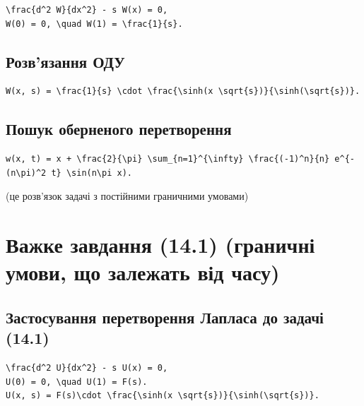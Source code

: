 \documentclass[
  ukrainian,
]{article}
\begin{document}
\begin{verbatim}
\frac{d^2 W}{dx^2} - s W(x) = 0,
W(0) = 0, \quad W(1) = \frac{1}{s}.
\end{verbatim}

\subsection{Розв'язання
ОДУ}\label{ux440ux43eux437ux432ux44fux437ux430ux43dux43dux44f-ux43eux434ux443}

\begin{verbatim}
W(x, s) = \frac{1}{s} \cdot \frac{\sinh(x \sqrt{s})}{\sinh(\sqrt{s})}.
\end{verbatim}

\subsection{Пошук оберненого
перетворення}\label{ux43fux43eux448ux443ux43a-ux43eux431ux435ux440ux43dux435ux43dux43eux433ux43e-ux43fux435ux440ux435ux442ux432ux43eux440ux435ux43dux43dux44f}

\begin{verbatim}
w(x, t) = x + \frac{2}{\pi} \sum_{n=1}^{\infty} \frac{(-1)^n}{n} e^{-(n\pi)^2 t} \sin(n\pi x).
\end{verbatim}

(це розв'язок задачі з постійними граничними умовами)

\section{Важке завдання (14.1) (граничні умови, що залежать від
часу)}\label{ux432ux430ux436ux43aux435-ux437ux430ux432ux434ux430ux43dux43dux44f-14.1-ux433ux440ux430ux43dux438ux447ux43dux456-ux443ux43cux43eux432ux438-ux449ux43e-ux437ux430ux43bux435ux436ux430ux442ux44c-ux432ux456ux434-ux447ux430ux441ux443}

\subsection{Застосування перетворення Лапласа до задачі
(14.1)}\label{ux437ux430ux441ux442ux43eux441ux443ux432ux430ux43dux43dux44f-ux43fux435ux440ux435ux442ux432ux43eux440ux435ux43dux43dux44f-ux43bux430ux43fux43bux430ux441ux430-ux434ux43e-ux437ux430ux434ux430ux447ux456-14.1}

\begin{verbatim}
\frac{d^2 U}{dx^2} - s U(x) = 0,
U(0) = 0, \quad U(1) = F(s).
U(x, s) = F(s)\cdot \frac{\sinh(x \sqrt{s})}{\sinh(\sqrt{s})}.
\end{verbatim}
\end{document}
